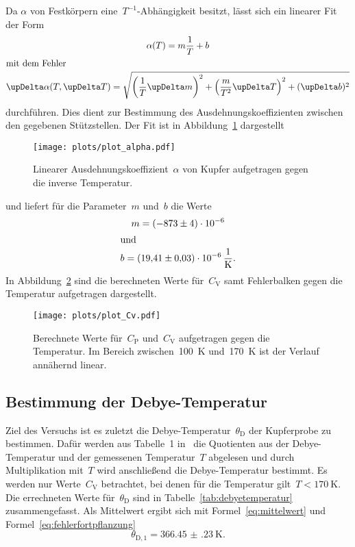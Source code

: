 Da $\alpha$ von Festkörpern eine~$T^{-1}$-Abhängigkeit besitzt, lässt sich ein linearer Fit der Form
\begin{gather}
  \alpha(T)=m\frac{1}{T}+b \\
  \shortintertext{mit dem Fehler}
  \upDelta\alpha(T,\upDelta T)=\sqrt{\left(\frac{1}{T}\upDelta m\right)^2+\left(\frac{m}{T^2}\upDelta T\right)^2+(\upDelta b)^2}
\end{gather}
durchführen. Dies dient zur Bestimmung des Ausdehnungskoeffizienten zwischen den gegebenen Stützstellen.
Der Fit ist in Abbildung~\ref{fig:plot_alpha} dargestellt\\
\newline
\begin{figure}[htb]
    \centering
    \texttt{[image: plots/plot\_alpha.pdf]}
    \caption{Linearer Ausdehnungskoeffizient~$\alpha$ von Kupfer aufgetragen
    gegen die inverse Temperatur.}
    \label{fig:plot_alpha}
\end{figure}
und liefert für die Parameter~$m$ und~$b$ die Werte
\begin{gather}
  m = \SI{-873(4)e-6}{} \\
  \shortintertext{und}
  b = \SI{19.41(3)e-6}{\per\kelvin}.
\end{gather}
In Abbildung~\ref{fig:plot_Cv} sind
die berechneten Werte für~$C_{\mathrm{V}}$ samt Fehlerbalken gegen die Temperatur aufgetragen dargestellt.\\

\begin{figure}[htb]
    \centering
    \texttt{[image: plots/plot\_Cv.pdf]}
    \caption{Berechnete Werte für~$C_{\mathrm{P}}$ und~$C_{\mathrm{V}}$
    aufgetragen gegen die Temperatur. Im Bereich zwischen~\SI{100}{\kelvin}
    und~\SI{170}{\kelvin} ist der Verlauf annähernd linear.}
    \label{fig:plot_Cv}
\end{figure}

\subsection{Bestimmung der Debye-Temperatur}
Ziel des Versuchs ist es zuletzt die Debye-Temperatur~$\theta_{\mathrm{D}}$ der Kupferprobe zu
bestimmen. Dafür werden aus Tabelle~1 in~\cite{anleitung} die Quotienten aus der
Debye-Temperatur und der gemessenen Temperatur~$T$ abgelesen und durch
Multiplikation mit~$T$ wird anschließend die Debye-Temperatur bestimmt. Es werden nur
Werte~$C_{\mathrm{V}}$ betrachtet, bei denen für die Temperatur gilt~$T<\SI{170}{\kelvin}$.
Die errechneten Werte für~$\theta_{\mathrm{D}}$ sind in
Tabelle~\ref{tab:debyetemperatur} zusammengefasst. Als Mittelwert ergibt sich
mit Formel~\eqref{eq:mittelwert} und Formel~\eqref{eq:fehlerfortpflanzung}
\begin{equation}
  \theta_{\mathrm{D},1}=\SI{366.45(23)}{\kelvin}.
\end{equation}

